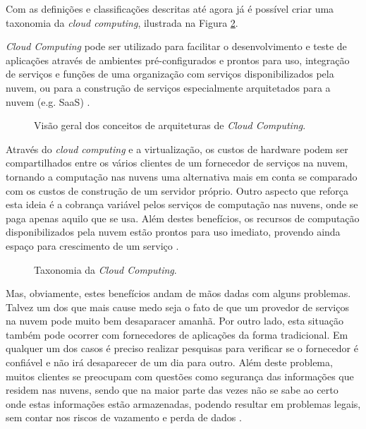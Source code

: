 \documentclass[diss]{template/setrem}
\begin{document}
Com as definições e classificações descritas até agora já é possível criar uma taxonomia da \emph{cloud computing}, ilustrada na Figura \ref{fig:cloud-computing-taxonomy}.

\emph{Cloud Computing} pode ser utilizado para facilitar o desenvolvimento e teste de aplicações através de ambientes pré-configurados e prontos para uso, integração de serviços e funções de uma organização com serviços disponibilizados pela nuvem, ou para a construção de serviços especialmente arquitetados para a nuvem (e.g. SaaS) \citep{Vogel2011}.

\begin{figure}[!h]
    \caption{Visão geral dos conceitos de arquiteturas de \emph{Cloud Computing}.}
    \label{fig:cloud-computing-overview}
\end{figure}

Através do \emph{cloud computing} e a virtualização, os custos de hardware podem ser compartilhados entre os vários clientes de um fornecedor de serviços na nuvem, tornando a computação nas nuvens uma alternativa mais em conta se comparado com os custos de construção de um servidor próprio. Outro aspecto que reforça esta ideia é a cobrança variável pelos serviços de computação nas nuvens, onde se paga apenas aquilo que se usa. Além destes benefícios, os recursos de computação disponibilizados pela nuvem estão prontos para uso imediato, provendo ainda espaço para crescimento de um serviço \citep{Vogel2011}.

\begin{figure}[!h]
    \caption{Taxonomia da \emph{Cloud Computing}.}
    \label{fig:cloud-computing-taxonomy}
\end{figure}

Mas, obviamente, estes benefícios andam de mãos dadas com alguns problemas. Talvez um dos que mais cause medo seja o fato de que um provedor de serviços na nuvem pode muito bem desaparacer amanhã. Por outro lado, esta situação também pode ocorrer com fornecedores de aplicações da forma tradicional. Em qualquer um dos casos é preciso realizar pesquisas para verificar se o fornecedor é confiável e não irá desaparecer de um dia para outro. Além deste problema, muitos clientes se preocupam com questões como segurança das informações que residem nas nuvens, sendo que na maior parte das vezes não se sabe ao certo onde estas informações estão armazenadas, podendo resultar em problemas legais, sem contar nos riscos de vazamento e perda de dados \citep{Vogel2011}.
\end{document}
